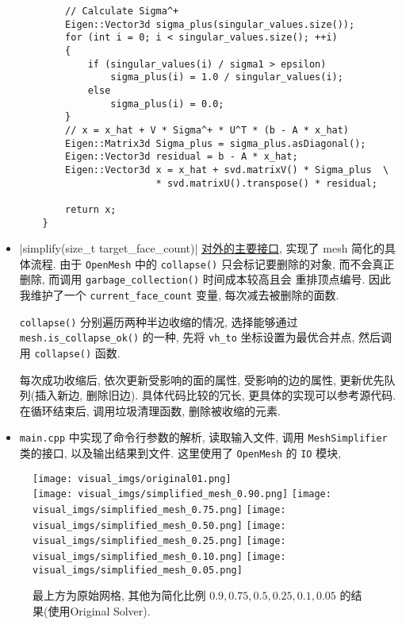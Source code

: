 \documentclass[11pt]{article}
\newcommand\1{\mathds{1}}
\begin{document}
\begin{itemize}
\begin{verbatim}
        // Calculate Sigma^+
        Eigen::Vector3d sigma_plus(singular_values.size());
        for (int i = 0; i < singular_values.size(); ++i)
        {
            if (singular_values(i) / sigma1 > epsilon)
                sigma_plus(i) = 1.0 / singular_values(i);
            else
                sigma_plus(i) = 0.0;
        }
        // x = x_hat + V * Sigma^+ * U^T * (b - A * x_hat)
        Eigen::Matrix3d Sigma_plus = sigma_plus.asDiagonal();
        Eigen::Vector3d residual = b - A * x_hat;
        Eigen::Vector3d x = x_hat + svd.matrixV() * Sigma_plus  \
                        * svd.matrixU().transpose() * residual;

        return x;
    }
    \end{verbatim}

    \item {}|simplify(size_t target_face_count)| 
    \underline{对外的主要接口}, 实现了 mesh 简化的具体流程. 由于 \texttt{OpenMesh} 中的 \texttt{collapse()} 
    只会标记要删除的对象, 而不会真正删除, 而调用 \texttt{garbage\_collection()} 时间成本较高且会
    重排顶点编号. 因此我维护了一个 \texttt{current\_face\_count} 变量, 每次减去被删除的面数.

    \texttt{collapse()} 分别遍历两种半边收缩的情况, 选择能够通过 \texttt{mesh.is\_collapse\_ok()} 
    的一种, 先将 \texttt{vh\_to} 坐标设置为最优合并点, 然后调用 \texttt{collapse()} 函数. 

    每次成功收缩后, 依次更新受影响的面的属性, 受影响的边的属性, 更新优先队列(插入新边, 删除旧边).
    具体代码比较的冗长, 更具体的实现可以参考源代码. 在循环结束后, 调用垃圾清理函数, 
    删除被收缩的元素.

    \item \texttt{main.cpp} 中实现了命令行参数的解析, 读取输入文件, 调用 \texttt{MeshSimplifier} 类的接口,
    以及输出结果到文件. 这里使用了 \texttt{OpenMesh} 的 \texttt{IO} 模块,
\end{itemize}
\begin{figure}[htbp]
    \centering
    \texttt{[image: visual\_imgs/original01.png]} \\
    \texttt{[image: visual\_imgs/simplified\_mesh\_0.90.png]}
    \texttt{[image: visual\_imgs/simplified\_mesh\_0.75.png]}
    \texttt{[image: visual\_imgs/simplified\_mesh\_0.50.png]}
    \texttt{[image: visual\_imgs/simplified\_mesh\_0.25.png]}
    \texttt{[image: visual\_imgs/simplified\_mesh\_0.10.png]}
    \texttt{[image: visual\_imgs/simplified\_mesh\_0.05.png]}
    \caption{最上方为原始网格, 其他为简化比例 $0.9, 0.75, 0.5, 0.25, 0.1, 0.05$ 的结果(使用Original Solver).}
    \label{fig:visual}
\end{figure}
\end{document}
